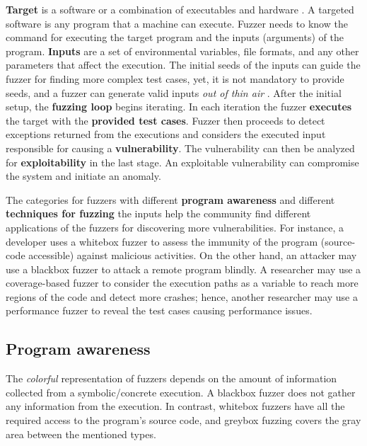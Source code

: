 \textbf{Target} is a software or a combination of executables and hardware \cite{song2019periscope}. A targeted software is any program that a machine can execute. Fuzzer needs to know the command for executing the target program and the inputs (arguments) of the program. \textbf{Inputs} are a set of environmental variables, file formats, and any other parameters that affect the execution. The initial seeds of the inputs can guide the fuzzer for finding more complex test cases, yet, it is not mandatory to provide seeds, and a fuzzer can generate valid inputs \textit{out of thin air} \cite{out_of_thin_air}. After the initial setup, the \textbf{fuzzing loop} begins iterating. In each iteration the fuzzer \textbf{executes} the target with the \textbf{provided test cases}. Fuzzer then proceeds to detect exceptions returned from the executions and considers the executed input responsible for causing a \textbf{vulnerability}. The vulnerability can then be analyzed for \textbf{exploitability} in the last stage. An exploitable vulnerability can compromise the system and initiate an anomaly.

The categories for fuzzers with different \textbf{program awareness} and different \textbf{techniques for fuzzing} the inputs help the community find different applications of the fuzzers for discovering more vulnerabilities. For instance, a developer uses a whitebox fuzzer to assess the immunity of the program (source-code accessible) against malicious activities. On the other hand, an attacker may use a blackbox fuzzer to attack a remote program blindly. A researcher may use a coverage-based fuzzer to consider the execution paths as a variable to reach more regions of the code and detect more crashes; hence, another researcher may use a performance fuzzer to reveal the test cases causing performance issues. 

\subsection{Program awareness}


The \textit{colorful} representation of fuzzers depends on the amount of information collected from a symbolic/concrete execution. A blackbox fuzzer does not gather any information from the execution. In contrast, whitebox fuzzers have all the required access to the program's source code, and greybox fuzzing covers the gray area between the mentioned types.

